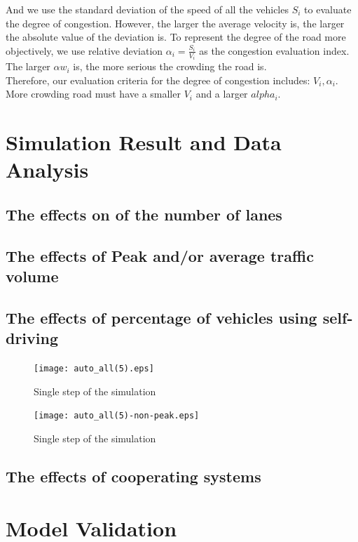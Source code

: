 \documentclass{mcmthesis}
\begin{document}
\indent And we use the standard deviation of the speed of all the vehicles $S_{i}$ to evaluate the degree of congestion. However, the larger the average velocity is, the larger the absolute value of the deviation is. To represent the degree of the road more objectively, we use relative deviation $\alpha_{i} =\frac{S_{i } }{V_{i}} $ as the congestion evaluation index. The larger $\alpha w_{i}$ is, the more serious the crowding the road is.\\
Therefore, our evaluation criteria for the degree of congestion includes: $V_{i}, \alpha_{i} $. More crowding road must have a smaller $V_{i}$ and a larger $alpha_{i}$.\\
 
 
\section{Simulation Result and Data Analysis}
\subsection{The effects on of the number of lanes}

\subsection{The effects of Peak and/or average traffic volume}

\subsection{The effects of percentage of vehicles using self-driving}
\begin{figure}[H]
	\centerline{\texttt{[image: auto\_all(5).eps]}}
	\caption{Single step of the simulation}
\end{figure}

\begin{figure}[H]
	\centerline{\texttt{[image: auto\_all(5)-non-peak.eps]}}
	\caption{Single step of the simulation}
\end{figure}

\subsection{The effects of cooperating systems}

\section{Model Validation}
\end{document}
